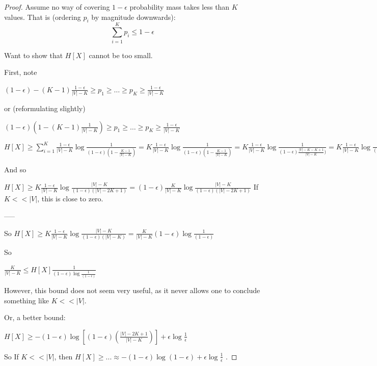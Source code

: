 \documentclass[11pt,letterpaper]{article}
\begin{document}
\begin{proof}
Assume no way of covering $1-\epsilon$ probability mass takes less than $K$ values.
That is (ordering $p_i$ by magnitude downwards):
$$\sum_{i=1}^K p_i \leq 1-\epsilon$$

Want to show that $H[X]$ cannot be too small.

First, note

$(1-\epsilon) - (K-1) \frac{1-\epsilon}{|V|-K} \geq p_1 \geq \dots \geq p_K \geq \frac{1-\epsilon}{|V|-K}$

or (reformulating slightly)

$(1-\epsilon) (1 - (K-1) \frac{1}{|V|-K}) \geq p_1 \geq \dots \geq p_K \geq \frac{1-\epsilon}{|V|-K}$

$H[X] \geq \sum_{i=1}^K \frac{1-\epsilon}{|V|-K} \log \frac{1}{(1-\epsilon) (1 -  \frac{K-1}{|V|-K})} = K \frac{1-\epsilon}{|V|-K} \log \frac{1}{(1-\epsilon) (1 -  \frac{K-1}{|V|-K})} = K \frac{1-\epsilon}{|V|-K} \log \frac{1}{(1-\epsilon) \frac{|V|-K-K+1}{|V|-K})} = K \frac{1-\epsilon}{|V|-K} \log \frac{{|V|-K}}{(1-\epsilon) (|V|-2K+1)}$


And so


$H[X] \geq  K \frac{1-\epsilon}{|V|-K} \log \frac{{|V|-K}}{(1-\epsilon) (|V|-2K+1)} =  (1-\epsilon) \frac{K}{|V|-K} \log \frac{{|V|-K}}{(1-\epsilon) (|V|-2K+1)} $
If $K << |V|$, this is close to zero.

-----

So
$H[X] \geq K \frac{1-\epsilon}{|V|-K} \log \frac{{|V|-K}}{(1-\epsilon) (|V|-K)} = \frac{K}{|V|-K} (1-\epsilon) \log \frac{1}{(1-\epsilon)}$

So

$\frac{K}{|V|-K} \leq H[X] \frac{1}{(1-\epsilon) \log \frac{1}{(1-\epsilon)}}$

However, this bound does not seem very useful, as it never allows one to conclude something like $K << |V|$.

Or, a better bound:

$H[X] \geq  - (1-\epsilon) \log \left[ (1-\epsilon)  \left(\frac{|V|-2K+1}{|V|-K}\right) \right] + \epsilon \log \frac{1}{\epsilon}$

So If $K << |V|$, then $H[X] \geq ... \approx -(1-\epsilon) \log (1-\epsilon)  + \epsilon \log \frac{1}{\epsilon}$ .


\end{proof}


\end{document}
